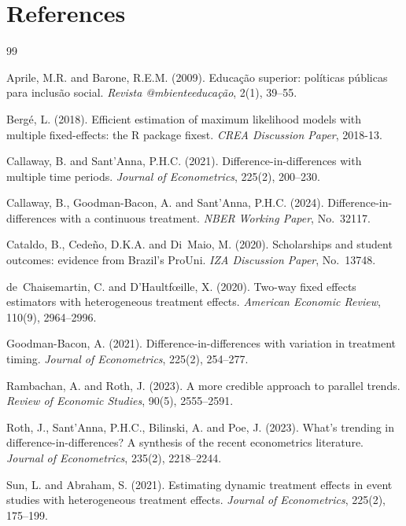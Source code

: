 \documentclass[a4paper,11pt]{article}
\begin{document}
\section{References}

\begingroup
\renewcommand{\section}[2]{}
\begin{thebibliography}{99}

Aprile, M.R. and Barone, R.E.M. (2009).
\newblock Educa\c{c}\~ao superior: pol\'iticas p\'ublicas para inclus\~ao social.
\newblock \textit{Revista @mbienteeduca\c{c}\~ao}, 2(1), 39--55.

Berg\'e, L. (2018).
\newblock Efficient estimation of maximum likelihood models with multiple fixed-effects: the R package fixest.
\newblock \textit{CREA Discussion Paper}, 2018-13.

Callaway, B. and Sant'Anna, P.H.C. (2021).
\newblock Difference-in-differences with multiple time periods.
\newblock \textit{Journal of Econometrics}, 225(2), 200--230.

Callaway, B., Goodman-Bacon, A. and Sant'Anna, P.H.C. (2024).
\newblock Difference-in-differences with a continuous treatment.
\newblock \textit{NBER Working Paper}, No.\ 32117.

Cataldo, B., Cede\~no, D.K.A. and Di~Maio, M. (2020).
\newblock Scholarships and student outcomes: evidence from Brazil's ProUni.
\newblock \textit{IZA Discussion Paper}, No.\ 13748.

de~Chaisemartin, C. and D'Haultf\oe ille, X. (2020).
\newblock Two-way fixed effects estimators with heterogeneous treatment effects.
\newblock \textit{American Economic Review}, 110(9), 2964--2996.

Goodman-Bacon, A. (2021).
\newblock Difference-in-differences with variation in treatment timing.
\newblock \textit{Journal of Econometrics}, 225(2), 254--277.

Rambachan, A. and Roth, J. (2023).
\newblock A more credible approach to parallel trends.
\newblock \textit{Review of Economic Studies}, 90(5), 2555--2591.

Roth, J., Sant'Anna, P.H.C., Bilinski, A. and Poe, J. (2023).
\newblock What's trending in difference-in-differences? A synthesis of the recent econometrics literature.
\newblock \textit{Journal of Econometrics}, 235(2), 2218--2244.

Sun, L. and Abraham, S. (2021).
\newblock Estimating dynamic treatment effects in event studies with heterogeneous treatment effects.
\newblock \textit{Journal of Econometrics}, 225(2), 175--199.

\end{thebibliography}
\endgroup
\end{document}
